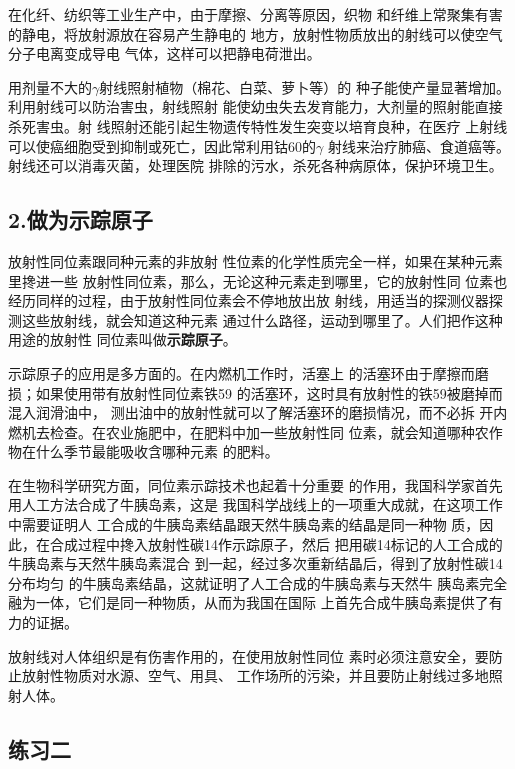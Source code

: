 在化纤、纺织等工业生产中，由于摩擦、分离等原因，织物
和纤维上常聚集有害的静电，将放射源放在容易产生静电的
地方，放射性物质放出的射线可以使空气分子电离变成导电
气体，这样可以把静电荷泄出。

用剂量不大的$\gamma$射线照射植物（棉花、白菜、萝卜等）的
种子能使产量显著增加。利用射线可以防治害虫，射线照射
能使幼虫失去发育能力，大剂量的照射能直接杀死害虫。射
线照射还能引起生物遗传特性发生突变以培育良种，在医疗
上射线可以使癌细胞受到抑制或死亡，因此常利用钴60的$\gamma$
射线来治疗肺癌、食道癌等。射线还可以消毒灭菌，处理医院
排除的污水，杀死各种病原体，保护环境卫生。

\subsection*{2.做为示踪原子}

放射性同位素跟同种元素的非放射
性位素的化学性质完全一样，如果在某种元素里搀进一些
放射性同位素，那么，无论这种元素走到哪里，它的放射性同
位素也经历同样的过程，由于放射性同位素会不停地放出放
射线，用适当的探测仪器探测这些放射线，就会知道这种元素
通过什么路径，运动到哪里了。人们把作这种用途的放射性
同位素叫做\textbf{示踪原子}。

示踪原子的应用是多方面的。在内燃机工作时，活塞上
的活塞环由于摩擦而磨损；如果使用带有放射性同位素铁59
的活塞环，这时具有放射性的铁59被磨掉而混入润滑油中，
测出油中的放射性就可以了解活塞环的磨损情况，而不必拆
开内燃机去检查。在农业施肥中，在肥料中加一些放射性同
位素，就会知道哪种农作物在什么季节最能吸收含哪种元素
的肥料。

在生物科学研究方面，同位素示踪技术也起着十分重要
的作用，我国科学家首先用人工方法合成了牛胰岛素，这是
我国科学战线上的一项重大成就，在这项工作中需要证明人
工合成的牛胰岛素结晶跟天然牛胰岛素的结晶是同一种物
质，因此，在合成过程中搀入放射性碳14作示踪原子，然后
把用碳14标记的人工合成的牛胰岛素与天然牛胰岛素混合
到一起，经过多次重新结晶后，得到了放射性碳14分布均匀
的牛胰岛素结晶，这就证明了人工合成的牛胰岛素与天然牛
胰岛素完全融为一体，它们是同一种物质，从而为我国在国际
上首先合成牛胰岛素提供了有力的证据。

放射线对人体组织是有伤害作用的，在使用放射性同位
素时必须注意安全，要防止放射性物质对水源、空气、用具、
工作场所的污染，并且要防止射线过多地照射人体。


\subsection*{练习二}

